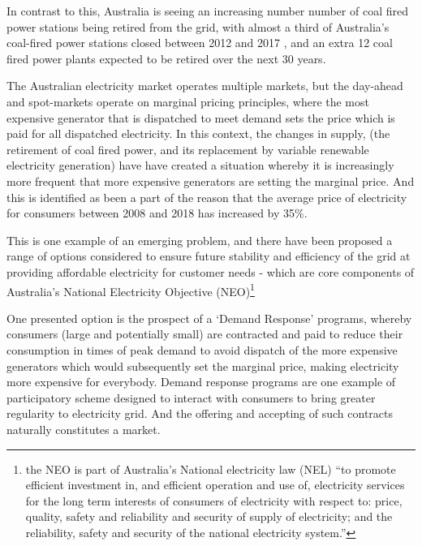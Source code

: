 In contrast to this, Australia is seeing an increasing number number of coal fired power stations being retired from the grid,
with almost a third of Australia's coal-fired power stations closed between 2012 and 2017 \cite{doi:10.1111/1467-8489.12289},
and an extra 12 coal fired power plants expected to be retired over the next 30 years.\cite{australianenergymarketoperatorlimited2018}

The Australian electricity market operates multiple markets, but the day-ahead and spot-markets operate on marginal pricing principles, where the most expensive generator that is dispatched to meet demand sets the price which is paid for all dispatched electricity.
In this context, the changes in supply, (the retirement of coal fired power, and its replacement by variable renewable electricity generation) have have created a situation whereby it is increasingly more frequent that more expensive generators are setting the marginal price.
And this is identified as been a part of the reason that the average price of electricity for consumers between 2008 and 2018 has increased by 35\%. \cite{australiancompetitionconsumercommission2018}

This is one example of an emerging problem, and there have been proposed a range of options considered to ensure future stability and efficiency of the grid at providing affordable electricity for customer needs - which are core components of Australia's National Electricity Objective (NEO)\footnote{the NEO is part of Australia's National electricity law (NEL) ``to promote efficient investment in, and efficient operation and use of, electricity services for the long term interests of consumers of electricity with respect to: price, quality, safety and reliability and security of supply of electricity; and the reliability, safety and security of the national electricity system.''}

One presented option is the prospect of a `Demand Response' programs, whereby consumers (large and potentially small) are contracted and paid to reduce their consumption in times of peak demand to avoid dispatch of the more expensive generators which would subsequently set the marginal price, making electricity more expensive for everybody.
Demand response programs are one example of participatory scheme designed to interact with consumers to bring greater regularity to electricity grid. And the offering and accepting of such contracts naturally constitutes a market.

